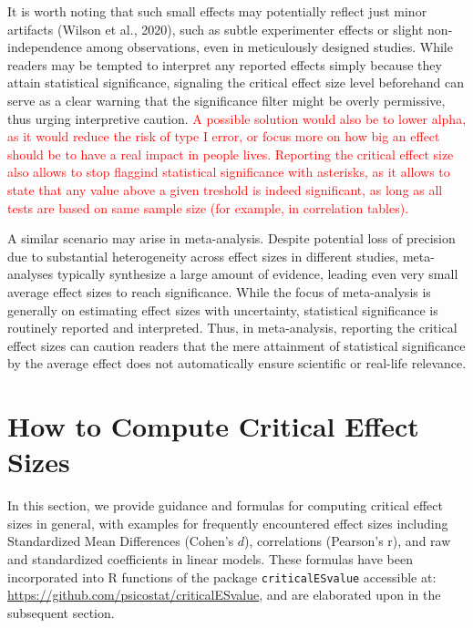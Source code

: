 \documentclass[
  man]{apa7}
\begin{document}
It is worth noting that such small effects may potentially reflect just minor artifacts (Wilson et al., 2020), such as subtle experimenter effects or slight non-independence among observations, even in meticulously designed studies. While readers may be tempted to interpret any reported effects simply because they attain statistical significance, signaling the critical effect size level beforehand can serve as a clear warning that the significance filter might be overly permissive, thus urging interpretive caution.\textcolor{red}{ A possible solution would also be to lower alpha, as it would reduce the risk of type I error, or focus more on how big an effect should be to have a real impact in people lives. Reporting the critical effect size also allows to stop flaggind statistical significance with asterisks, as it allows to state that any value above a given treshold is indeed significant, as long as all tests are based on same sample size (for example, in correlation tables).}

A similar scenario may arise in meta-analysis. Despite potential loss of precision due to substantial heterogeneity across effect sizes in different studies, meta-analyses typically synthesize a large amount of evidence, leading even very small average effect sizes to reach significance. While the focus of meta-analysis is generally on estimating effect sizes with uncertainty, statistical significance is routinely reported and interpreted. Thus, in meta-analysis, reporting the critical effect sizes can caution readers that the mere attainment of statistical significance by the average effect does not automatically ensure scientific or real-life relevance.

\hypertarget{how-to-compute-critical-effect-sizes}{%
\section{How to Compute Critical Effect Sizes}\label{how-to-compute-critical-effect-sizes}}

In this section, we provide guidance and formulas for computing critical effect sizes in general, with examples for frequently encountered effect sizes including Standardized Mean Differences (Cohen's \(d\)), correlations (Pearson's r), and raw and standardized coefficients in linear models. These formulas have been incorporated into R functions of the package \texttt{criticalESvalue} accessible at: \url{https://github.com/psicostat/criticalESvalue}, and are elaborated upon in the subsequent section.
\end{document}
